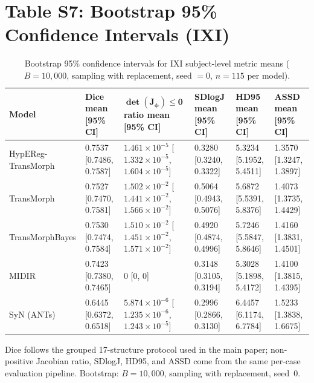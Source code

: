 \documentclass[11pt,a4paper]{article}
\begin{document}
\section{Table S7: Bootstrap 95\% Confidence Intervals (IXI)}
\begin{table}[H]
\caption{Bootstrap 95\% confidence intervals for IXI subject-level metric means (\(B=10{,}000\), sampling with replacement, seed \(=0\), \(n=115\) per model).\label{tab:s6_bootstrap_ci}}
\centering
\scriptsize
\setlength{\tabcolsep}{3pt}
\begin{tabularx}{\textwidth}{lXXXXX}
\toprule
\textbf{Model} & \textbf{Dice mean [95\% CI]} & \(\boldsymbol{\det(J_\phi)\le 0}\) \textbf{ratio mean [95\% CI]} & \textbf{SDlogJ mean [95\% CI]} & \textbf{HD95 mean [95\% CI]} & \textbf{ASSD mean [95\% CI]} \\
\midrule
HypEReg-TransMorph & 0.7537 [0.7486, 0.7587] & \(1.461\times10^{-5}\) [\(1.332\times10^{-5}\), \(1.604\times10^{-5}\)] & 0.3280 [0.3240, 0.3322] & 5.3234 [5.1952, 5.4511] & 1.3570 [1.3247, 1.3897] \\
TransMorph & 0.7527 [0.7470, 0.7581] & \(1.502\times10^{-2}\) [\(1.441\times10^{-2}\), \(1.566\times10^{-2}\)] & 0.5064 [0.4943, 0.5076] & 5.6872 [5.5391, 5.8376] & 1.4073 [1.3735, 1.4429] \\
TransMorphBayes & 0.7530 [0.7474, 0.7584] & \(1.510\times10^{-2}\) [\(1.451\times10^{-2}\), \(1.571\times10^{-2}\)] & 0.4920 [0.4874, 0.4996] & 5.7246 [5.5847, 5.8646] & 1.4160 [1.3831, 1.4501] \\
MIDIR & 0.7423 [0.7380, 0.7465] & 0 [0, 0] & 0.3148 [0.3105, 0.3194] & 5.3028 [5.1898, 5.4172] & 1.4100 [1.3815, 1.4395] \\
SyN (ANTs) & 0.6445 [0.6372, 0.6518] & \(5.874\times10^{-6}\) [\(1.235\times10^{-6}\), \(1.243\times10^{-5}\)] & 0.2996 [0.2866, 0.3130] & 6.4457 [6.1174, 6.7784] & 1.5233 [1.3838, 1.6675] \\
\bottomrule
\end{tabularx}
\parbox{\textwidth}{\footnotesize Dice follows the grouped 17-structure protocol used in the main paper; non-positive Jacobian ratio, SDlogJ, HD95, and ASSD come from the same per-case evaluation pipeline. Bootstrap: $B=10{,}000$, sampling with replacement, seed~0.}
\end{table}
\end{document}
